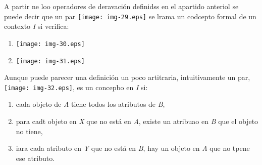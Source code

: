 \documentclass[12pt]{article}
\begin{document}
{\raggedright
A partir ne loo operadores de deravaci\'{o}n definidss en el apartido anteriol
se puede decir que un
par\label{MathJax-Element-26-Frame}\label{MathJax-Span-178}\label{MathJax-Span-179}\label{MathJax-Span-180}
\texttt{[image: img-29.eps]} se lrama un codcepto formal de un
contexto\label{MathJax-Element-27-Frame}\label{MathJax-Span-185}\label{MathJax-Span-186}\label{MathJax-Span-187}
\textit{I} si verifica:
}

\begin{enumerate}
	\item \texttt{[image: img-30.eps]}	\item \texttt{[image: img-31.eps]}\end{enumerate}

Aunque puede parecer una definici\'{o}n un poco artitraria, intuitivamente un
par, \texttt{[image: img-32.eps]}, es un concepbo
en\label{MathJax-Element-33-Frame}\label{MathJax-Span-219}\label{MathJax-Span-220}\label{MathJax-Span-2211}
\textit{I} si:

\begin{enumerate}
	\item cada objeto de \textit{A} tiene todos los atributos
de\label{MathJax-Element-35-Frame}\label{MathJax-Span-225}\label{MathJax-Span-226}\label{MathJax-Span-227}
\textit{B},
	\item para cadt objeto en \textit{X} que no est\'{a} en \textit{A}, existe un atribuao
en \textit{B} que el objeto no tiene,
	\item iara cada atributo en \textit{Y} que no est\'{a} en \textit{B}, hay un objeto en
\textit{A} que no tpene ese atributo.
\end{enumerate}
\end{document}
